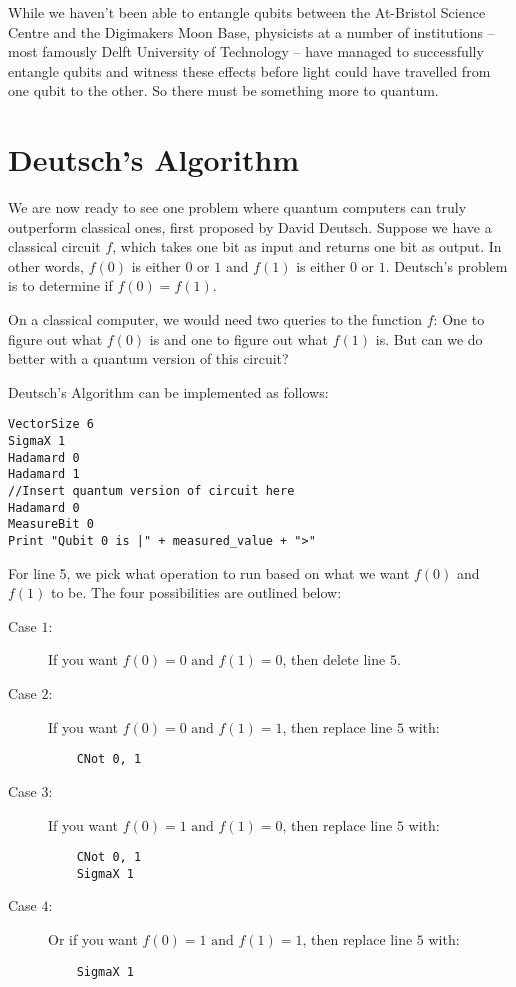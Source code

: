 \documentclass[twocolumn]{article}
\begin{document}
While we haven't been able to entangle qubits between the At-Bristol Science Centre and the Digimakers Moon Base, physicists at a number of institutions -- most famously Delft University of Technology -- have managed to successfully entangle qubits and witness these effects before light could have travelled from one qubit to the other. So there must be something more to quantum.

\section{Deutsch's Algorithm}
\label{sec:deutschs-algm}

We are now ready to see one problem where quantum computers can truly outperform classical ones, first proposed by David Deutsch. Suppose we have a classical circuit $f$, which takes one bit as input and returns one bit as output. In other words, $f(0)$ is either $0$ or $1$ and $f(1)$ is either $0$ or $1$. Deutsch's problem is to determine if $f(0) = f(1)$.

On a classical computer, we would need two queries to the function $f$: One to figure out what $f(0)$ is and one to figure out what $f(1)$ is. But can we do better with a quantum version of this circuit?

Deutsch's Algorithm can be implemented as follows:

\begin{lstlisting}
VectorSize 6
SigmaX 1
Hadamard 0
Hadamard 1
//Insert quantum version of circuit here
Hadamard 0
MeasureBit 0
Print "Qubit 0 is |" + measured_value + ">"
\end{lstlisting}

For line 5, we pick what operation to run based on what we want $f(0)$ and $f(1)$ to be. The four possibilities are outlined below:

\begin{description}
    \item[Case $1$:] If you want $f(0) = 0 \text{ and } f(1) = 0$, then delete line $5$.

    \item[Case $2$:] If you want $f(0) = 0 \text{ and } f(1) = 1$, then replace line $5$ with:

    \begin{lstlisting}
    CNot 0, 1
    \end{lstlisting}

    \item[Case $3$:] If you want $f(0) = 1 \text{ and } f(1) = 0$, then replace line $5$ with:

    \begin{lstlisting}
    CNot 0, 1
    SigmaX 1
    \end{lstlisting}

    \item[Case $4$:] Or if you want $f(0) = 1 \text{ and } f(1) = 1$, then replace line $5$ with:

    \begin{lstlisting}
    SigmaX 1
    \end{lstlisting}
\end{description}
\end{document}
